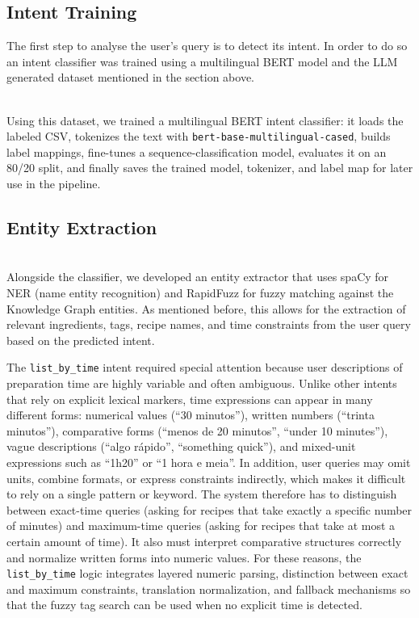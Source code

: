 \documentclass{article}
\begin{document}
\subsection{Intent Training}
\noindent
The first step to analyse the user's query is to detect its intent. In order to do so an intent classifier was trained using a multilingual BERT model \cite{devlin2019bert} and the LLM generated dataset mentioned in the section above. 



\noindent
\\
 Using this dataset, we trained a multilingual BERT \cite{devlin2019bert} intent classifier: it loads the labeled CSV, tokenizes the text with \texttt{bert-base-multilingual-cased}, builds label mappings, fine-tunes a sequence-classification model, evaluates it on an 80/20 split, and finally saves the trained model, tokenizer, and label map for later use in the pipeline.
 
 
\subsection{Entity Extraction}
 

 \noindent
\\
 Alongside the classifier, we developed an entity extractor that uses spaCy \cite{honnibal2020spacy} for NER (name entity recognition) \cite{A_Brief_History_of_Named_Entity_Recognition}and RapidFuzz \cite{rapidfuzz} for fuzzy matching against the Knowledge Graph entities. As mentioned before, this allows for the extraction of relevant ingredients, tags, recipe names, and time constraints from the user query based on the predicted intent.


The \texttt{list\_by\_time} intent required special attention because user descriptions of preparation time are highly variable and often ambiguous. Unlike other intents that rely on explicit lexical markers, time expressions can appear in many different forms: numerical values (``30 minutos''), written numbers (``trinta minutos''), comparative forms (``menos de 20 minutos'', ``under 10 minutes''), vague descriptions (``algo rápido'', ``something quick''), and mixed-unit expressions such as ``1h20'' or ``1 hora e meia''. In addition, user queries may omit units, combine formats, or express constraints indirectly, which makes it difficult to rely on a single pattern or keyword. The system therefore has to distinguish between exact-time queries (asking for recipes that take exactly a specific number of minutes) and maximum-time queries (asking for recipes that take at most a certain amount of time). It also must interpret comparative structures correctly and normalize written forms into numeric values. For these reasons, the \texttt{list\_by\_time} logic integrates layered numeric parsing, distinction between exact and maximum constraints, translation normalization, and fallback mechanisms so that the fuzzy tag search can be used when no explicit time is detected.
\end{document}

